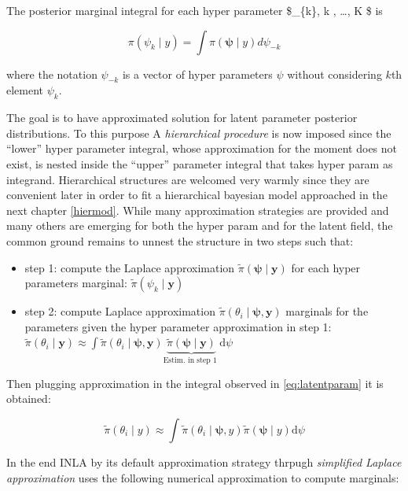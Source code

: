 \documentclass[
  12pt,
  a4paper,
  oneside]{book}
\providecommand{\tightlist}{%
  \setlength{\itemsep}{0pt}\setlength{\parskip}{0pt}}
\theoremstyle{definition}
\theoremstyle{definition}
\theoremstyle{definition}
\theoremstyle{remark}
\begin{document}
The posterior marginal integral for each hyper parameter \$\psi\_\{k\}, \forall k , \ldots, K \$ is

\[
\pi\left(\psi_{k} \mid y\right)=\int \pi(\boldsymbol{\psi} \mid y) d \psi_{-k}
\]

where the notation \(\psi_{-k}\) is a vector of hyper parameters \(\psi\) without considering \(k\)th element \(\psi_{k}\).

The goal is to have approximated solution for latent parameter posterior distributions. To this purpose A \emph{hierarchical procedure} is now imposed since the ``lower'' hyper parameter integral, whose approximation for the moment does not exist, is nested inside the ``upper'' parameter integral that takes hyper param as integrand. Hierarchical structures are welcomed very warmly since they are convenient later in order to fit a hierarchical bayesian model approached in the next chapter \ref{hiermod}. While many approximation strategies are provided and many others are emerging for both the hyper param and for the latent field, the common ground remains to unnest the structure in two steps such that:

\begin{itemize}
\tightlist
\item
  step 1: compute the Laplace approximation \(\tilde\pi\left(\boldsymbol{\psi} \mid \boldsymbol{y}\right)\) for each hyper parameters marginal: \(\tilde\pi\left(\psi_{k} \mid \boldsymbol{y}\right)\)
\item
  step 2: compute Laplace approximation \(\tilde{\pi}\left(\theta_{i} \mid \boldsymbol{\psi}, \boldsymbol{y}\right)\) marginals for the parameters given the hyper parameter approximation in step 1: \(\tilde{\pi}\left(\theta_{i} \mid \boldsymbol{y}\right) \approx \int \tilde{\pi}\left(\theta_{i} \mid \boldsymbol{\psi}, \boldsymbol{y}\right) \underbrace{\tilde{\pi}(\boldsymbol{\psi} \mid \boldsymbol{y})}_{\text {Estim. in step 1 }} \mathrm{d} \psi\)
\end{itemize}

Then plugging approximation in the integral observed in \eqref{eq:latentparam} it is obtained:

\[
\tilde{\pi}\left(\theta_{i} \mid y\right) \approx \int \tilde{\pi}\left(\theta_{i} \mid  \boldsymbol{\psi}, y\right) \tilde{\pi}(\boldsymbol{\psi} \mid y) \mathrm{d} \psi
\]

In the end INLA by its default approximation strategy thrpugh \emph{simplified Laplace approximation} uses the following numerical approximation to compute marginals:
\end{document}
